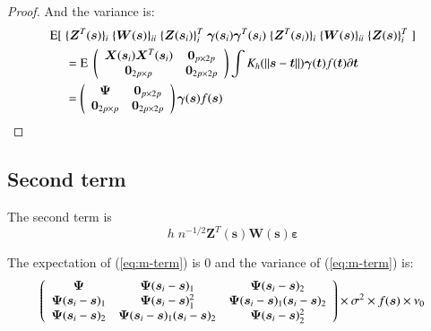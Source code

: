 \documentclass[authoryear, review, 11pt]{elsarticle}
\begin{document}
\begin{proof}
            And the variance is:
            \begin{align}
                \text{E} [ \; &\{ \bm{Z}^T(\bm{s}) \}_i \; \{ \bm{W}(\bm{s}) \}_{ii} \; \{ \bm{Z}(\bm{s}_i) \}_i^T \; \bm{\gamma}(\bm{s}_i) \bm{\gamma}^T(\bm{s}_i) \; \{ \bm{Z}^T(\bm{s}_i) \}_i \; \{ \bm{W}(\bm{s}) \}_{ii} \; \{ \bm{Z}(\bm{s}) \}^T_i \; ] \notag \\
                &= \text{E} \; \left( \begin{array}{cc} \bm{X}(\bm{s}_i) \bm{X}^T(\bm{s}_i)  & \bm{0}_{p \times 2p} \\ \bm{0}_{2p \times p} & \bm{0}_{2p \times 2p} \end{array} \right) \int K_h(\| \bm{s} - \bm{t} \|) \bm{\gamma}(\bm{t}) f(\bm{t}) \partial \bm{t} \notag \\
                &= \left( \begin{array}{cc} \bm{\Psi}  & \bm{0}_{p \times 2p} \\ \bm{0}_{2p \times p} & \bm{0}_{2p \times 2p} \end{array} \right) \bm{\gamma}(\bm{s}) f(\bm{s})
            \end{align}
        \end{proof}


        \subsection{Second term}
            The second term is 
            \begin{equation} \label{eq:epsilon-term}
                h \; n^{-1/2} \bm{Z}^T(\bm{s}) \bm{W}(\bm{s}) \bm{\varepsilon}
            \end{equation}

            The expectation of (\ref{eq:m-term}) is 0 and the variance of (\ref{eq:m-term}) is:
            \begin{equation*}
                \left( \begin{array}{ccc} \bm{\Psi} & \bm{\Psi} (\bm{s}_i - \bm{s})_1 & \bm{\Psi} (\bm{s}_i - \bm{s})_2 \\ \bm{\Psi} (\bm{s}_i - \bm{s})_1 & \bm{\Psi} (\bm{s}_i - \bm{s})^2_1 & \bm{\Psi} (\bm{s}_i - \bm{s})_1 (\bm{s}_i - \bm{s})_2 \\ \bm{\Psi} (\bm{s}_i - \bm{s})_2 & \bm{\Psi} (\bm{s}_i - \bm{s})_1 (\bm{s}_i - \bm{s})_2 & \bm{\Psi} (\bm{s}_i - \bm{s})^2_2 \end{array} \right) \times \sigma^2 \times f(\bm{s}) \times \nu_0 \notag \\
            \end{equation*}
\end{document}
